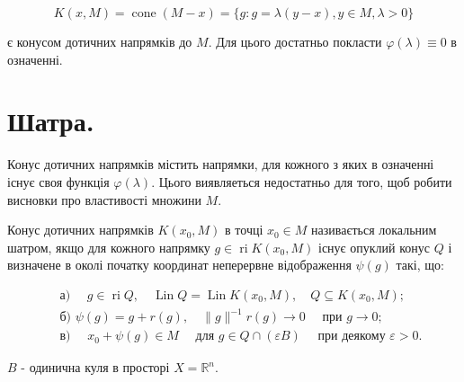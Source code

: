 \documentclass[10pt]{article}
\begin{document}
$$
K(x, M)=\operatorname{cone}(M-x)=\{g: g=\lambda(y-x), y \in M, \lambda>0\}
$$

є конусом дотичних напрямків до $M$. Для цього достатньо покласти $\varphi(\lambda) \equiv 0$ в означенні.

\section*{Шатра.}
Конус дотичних напрямків містить напрямки, для кожного з яких в означенні існує своя функція $\varphi(\lambda)$. Цього виявляеться недостатньо для того, щоб робити висновки про властивості множини $M$.

Конус дотичних напрямків $K\left(x_{0}, M\right)$ в точці $x_{0} \in M$ називається локальним шатром, якщо для кожного напрямку $g \in \operatorname{ri} K\left(x_{0}, M\right)$ існує опуклий конус $Q$ і визначене в околі початку координат неперервне відображення $\psi(g)$ такі, що:

$$
\begin{aligned}
& \text { а) } \quad g \in \operatorname{ri} Q, \quad \operatorname{Lin} Q=\operatorname{Lin} K\left(x_{0}, M\right), \quad Q \subseteq K\left(x_{0}, M\right) ; \\
& \text { б) } \psi(g)=g+r(g), \quad\|g\|^{-1} r(g) \rightarrow 0 \quad \text { при } g \rightarrow 0 ; \\
& \text { в) } \quad x_{0}+\psi(g) \in M \quad \text { для } g \in Q \cap(\varepsilon B) \quad \text { при деякому } \varepsilon>0 .
\end{aligned}
$$

$B$ - одинична куля в просторі $X=\mathbb{R}^{n}$.
\end{document}
